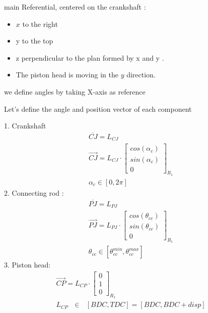 \documentclass[12pt,a4paper]{article}
\begin{document}
\begin{enumerate}
	main Referential, centered on the crankshaft :\\
	
	\begin{itemize}
		\item $x$ to the right
		\item y to the top
		\item z perpendicular to the plan formed by x and y .
		\item The piston head is moving in the $y$ direction.
	\end{itemize}
	
	we define angles by taking X-axis as reference
	
	Let's define the angle and position vector of each component
	

	1. Crankshaft
	\begin{eqnarray}
		\overline{CJ} = L_{CJ}\\
		\vec{CJ} = L_{CJ} \cdot 
		\begin{bmatrix}
			cos(\alpha_{c}) \\
			sin(\alpha_{c})\\
			0
		\end{bmatrix}_{R_{1}} \\
		\alpha_{c} \in [0, 2 \pi] 
	\end{eqnarray} 
	2. Connecting rod : 
	\begin{eqnarray}
		\overline{PJ} = L_{PJ}\\
		\vec{PJ} = L_{PJ} \cdot  
			\begin{bmatrix}
			cos(\theta_{cc}) \\
			sin(\theta_{cc}) \\
			0
		\end{bmatrix}_{R_{1}} \\
		\theta_{cc} \in [\theta_{cc}^{min}, \theta_{cc}^{max}]
	\end{eqnarray}
	3. Piston head: 
	\begin{eqnarray}
	\vec{CP} = L_{CP} \cdot  
	\begin{bmatrix}
		0 \\
		1 \\
		0
	\end{bmatrix}_{R_{1}} \\
	L_{CP} \text{ $\in$ } [BDC, TDC] = [BDC, BDC + disp]
	\end{eqnarray}

\end{enumerate}
\end{document}
